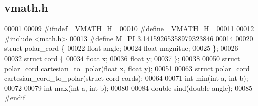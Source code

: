 \subsection{vmath.\+h}
\label{vmath_8h_source}

\begin{DoxyCode}
00001 
00009 \textcolor{preprocessor}{#ifndef \_VMATH\_H\_}
00010 \textcolor{preprocessor}{#define \_VMATH\_H\_}
00011 
00012 \textcolor{preprocessor}{#include <math.h>}
00013 \textcolor{preprocessor}{#define M\_PI 3.14159265358979323846}
00014 
00020 \textcolor{keyword}{struct }polar_cord \{
00022   \textcolor{keywordtype}{float} angle;
00024   \textcolor{keywordtype}{float} magnitue;
00025 \};
00026 
00032 \textcolor{keyword}{struct }cord \{
00034   \textcolor{keywordtype}{float} x;
00036   \textcolor{keywordtype}{float} y;
00037 \};
00038 
00050 \textcolor{keyword}{struct }polar_cord cartesian_to_polar(float x, float y);
00051 
00063 \textcolor{keyword}{struct }polar_cord cartesian_cord_to_polar(struct cord cords);
00064 
00071 \textcolor{keywordtype}{int} min(\textcolor{keywordtype}{int} a, \textcolor{keywordtype}{int} b);
00072 
00079 \textcolor{keywordtype}{int} max(\textcolor{keywordtype}{int} a, \textcolor{keywordtype}{int} b);
00080 
00084 \textcolor{keywordtype}{double} sind(\textcolor{keywordtype}{double} angle);
00085 \textcolor{preprocessor}{#endif}
\end{DoxyCode}
